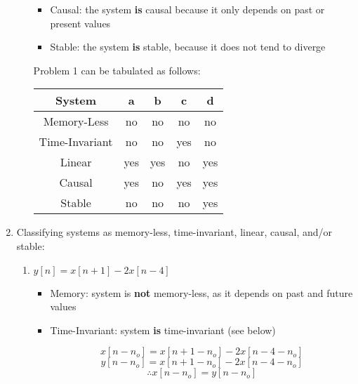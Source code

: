 \begin{enumerate}
\begin{enumerate}
\begin{itemize}
            \item Causal: the system \textbf{is} causal because it only depends on past or present values

            \item Stable: the system \textbf{is} stable, because it does not tend to diverge

        \end{itemize}

        Problem 1 can be tabulated as follows:

        \begin{center}
          \begin{tabular}[H]{|c|c|c|c|c|}
            \hline
            System & a & b & c & d\\
            \hline
            Memory-Less & no & no & no & no\\
            \hline
            Time-Invariant & no & no & yes & no\\
            \hline
            Linear & yes & yes & no & yes\\
            \hline
            Causal & yes & no & yes & yes\\
            \hline
            Stable & no & no & no & yes\\
            \hline
          \end{tabular}
        \end{center}

    \end{enumerate}

  \item Classifying systems as memory-less, time-invariant, linear, causal, and/or stable:

    \begin{enumerate}

      \item $y[n]=x[n+1]-2x[n-4]$

        \begin{itemize}

          \item Memory: system is \textbf{not} memory-less, as it depends on past and future values

          \item Time-Invariant: system \textbf{is} time-invariant (see below)

            $$x[n-n_o]=x[n+1-n_o]-2x[n-4-n_o]$$
            $$y[n-n_o]=x[n+1-n_o]-2x[n-4-n_o]$$
            $$\therefore x[n-n_o]=y[n-n_o]$$


\end{itemize}
\end{enumerate}
\end{enumerate}
